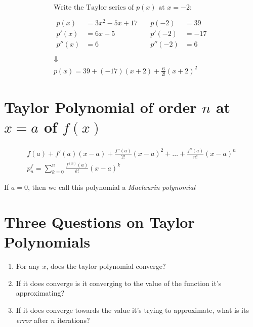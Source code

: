 \documentclass[00_complete]{subfiles}
\begin{document}
\begin{example}
$$
\begin{gathered}
    \text{Write the Taylor series of $p(x)$ at $x=-2$:} \\
    \\
    \begin{aligned}
        p(x) &= 3x^2-5x+17 \\
        p'(x) &= 6x-5 \\
        p''(x) &= 6 \\
    \end{aligned} \quad
    \begin{aligned}
        p(-2) &= 39 \\
        p'(-2) &= -17 \\
        p''(-2) &= 6 \\
    \end{aligned} \\
    \Downarrow \\
    p(x) = 39 + (-17)(x+2)+ \frac{6}{2!}(x+2)^2
\end{gathered}
$$
\end{example}

\section{Taylor Polynomial of order \texorpdfstring{$n$}{n} at
\texorpdfstring{$x=a$}{x=a} of \texorpdfstring{$f(x)$}{f(x)}}

$$
\begin{gathered}
    f(a)+ f'(a)(x-a)+ \frac{f''(a)}{2!}(x-a)^2+ \dots +
    \frac{f^{n}(a)}{n!}(x-a)^n \\
    \boxed{p^f_n = \sum_{k=0}^{n} \frac{f^{(n)}(a)}{k!}(x-a)^k}
\end{gathered}
$$
\begin{note}
    If $a=0$, then we call this polynomial a \emph{Maclaurin polynomial}
\end{note}

\section{Three Questions on Taylor Polynomials}

\begin{enumerate}
  \item For any $x$, does the taylor polynomial converge?
  \item If it does converge is it converging to the value of the function it's
      approximating?
  \item If it does converge towards the value it's trying to approximate, what
      is its \emph{error} after $n$ iterations?
\end{enumerate}
\end{document}

